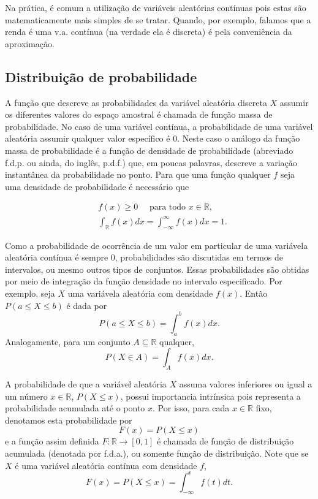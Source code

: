 \documentclass[
]{book}
\theoremstyle{definition}
\theoremstyle{definition}
\theoremstyle{definition}
\theoremstyle{remark}
\begin{document}
Na prática, é comum a utilização de variáveis aleatórias contínuas pois estas são matematicamente mais simples de se tratar. Quando, por exemplo, falamos que a renda é uma v.a. contínua (na verdade ela é
discreta) é pela conveniência da aproximação.

\hypertarget{distribuiuxe7uxe3o-de-probabilidade}{%
\subsection{Distribuição de probabilidade}\label{distribuiuxe7uxe3o-de-probabilidade}}

A função que descreve as probabilidades da variável aleatória discreta \(X\) assumir os diferentes valores do espaço amostral é chamada de função massa de probabilidade. No caso de uma variável contínua, a probabilidade de uma variável aleatória assumir qualquer valor específico é 0. Neste caso o análogo da função massa de probabilidade é a função de densidade de probabilidade (abreviado f.d.p. ou ainda, do inglês, p.d.f.) que, em poucas palavras, descreve a variação instantânea da probabilidade no ponto. Para que uma função qualquer \(f\) seja uma densidade de probabilidade é necessário que

\begin{align}
 &f(x)\geq0\quad \mbox{ para todo } x\in\mathbb{R},\nonumber\\
&\int_{\mathbb{R}}f(x)dx=\int_{-\infty}^{\infty}f(x)dx=1.
\label{eq:fdensidade}
\end{align}

Como a probabilidade de ocorrência de um valor em particular de uma variávela aleatória contínua é sempre 0, probabilidades são discutidas em termos de intervalos, ou mesmo outros tipos de conjuntos. Essas probabilidades são obtidas por meio de
integração da função densidade no intervalo especificado. Por exemplo, seja \(X\) uma variávela aleatória com densidade \(f(x)\). Então \(P(a \leq X \leq b)\) é dada por
\[P(a \leq X \leq b)=\int_a^b f(x)dx.\]
Analogamente, para um conjunto \(A\subseteq \mathbb{R}\) qualquer,
\[P(X\in A)=\int_A f(x)dx.\]

A probabilidade de que a variável aleatória \(X\) assuma valores inferiores ou igual a um número \(x\in\mathbb{R}\), \(P(X\leq x)\), possui importancia intrínsica pois representa a probabilidade acumulada até o ponto \(x\). Por isso, para cada \(x\in\mathbb{R}\) fixo, denotamos esta probabilidade por
\[F(x)=P(X\leq x)\]
e a função assim definida \(F:\mathbb{R}\rightarrow[0,1]\) é chamada
de função de distribuição acumulada (denotada por f.d.a.), ou
somente função de distribuição. Note que se \(X\) é uma variável aleatória contínua com densidade \(f\),
\[F(x)=P(X \leq x)=\int_{-\infty}^x f(t)dt.\]
\end{document}
